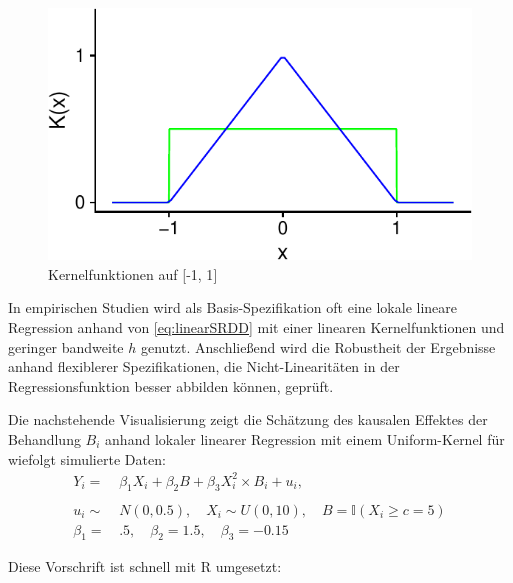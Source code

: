 \documentclass[
  a4paper,
  DIV=11,
  oneside]{scrreprt}
\begin{document}
\begin{figure}[t]

{\centering \includegraphics{RDD_files/figure-pdf/fig-linearkern-1.pdf}

}

\caption{\label{fig-linearkern}Kernelfunktionen auf {[}-1, 1{]}}

\end{figure}

In empirischen Studien wird als Basis-Spezifikation oft eine lokale
lineare Regression anhand von \eqref{eq:linearSRDD} mit einer linearen
Kernelfunktionen und geringer bandweite \(h\) genutzt. Anschließend wird
die Robustheit der Ergebnisse anhand flexiblerer Spezifikationen, die
Nicht-Linearitäten in der Regressionsfunktion besser abbilden können,
geprüft.

Die nachstehende Visualisierung zeigt die Schätzung des kausalen
Effektes der Behandlung \(B_i\) anhand lokaler linearer Regression mit
einem Uniform-Kernel für wiefolgt simulierte Daten: \begin{align*}
  Y_i =&\, \beta_1 X_i + \beta_2 B + \beta_3 X_i^2 \times B_i + u_i,\\
  \\
  u_i \sim&\, N(0, 0.5), \quad X_i \sim U(0, 10), \quad B = \mathbb{I}(X_i \geq c = 5)\\
  \beta_1 =&\, .5, \quad \beta_2 = 1.5, \quad \beta_3 = -0.15
\end{align*}

Diese Vorschrift ist schnell mit R umgesetzt:
\end{document}
